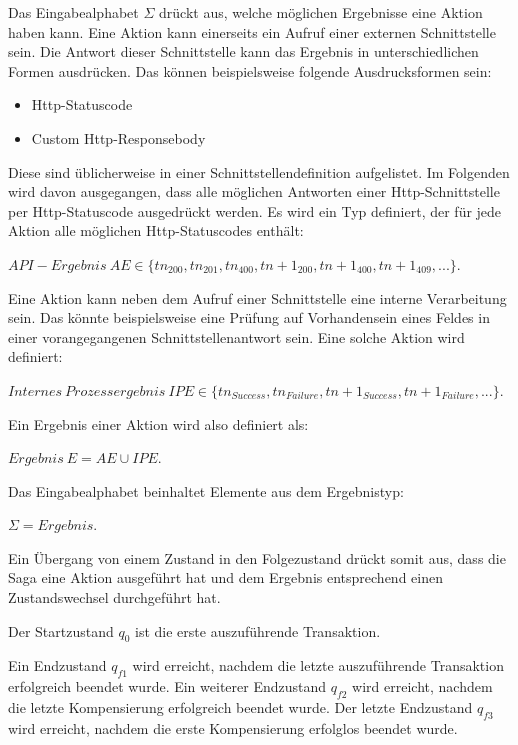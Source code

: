 Das Eingabealphabet $\Sigma$ drückt aus, welche möglichen Ergebnisse eine Aktion haben kann. Eine Aktion kann einerseits ein Aufruf einer externen Schnittstelle sein. Die Antwort dieser Schnittstelle kann das Ergebnis in unterschiedlichen Formen ausdrücken. Das können beispielsweise folgende Ausdrucksformen sein:
\begin{itemize}
	\item Http-Statuscode
	\item Custom Http-Responsebody
\end{itemize}
Diese sind üblicherweise in einer Schnittstellendefinition aufgelistet. Im Folgenden wird davon ausgegangen, dass alle möglichen Antworten einer Http-Schnittstelle per Http-Statuscode ausgedrückt werden. Es wird ein Typ definiert, der für jede Aktion alle möglichen Http-Statuscodes enthält: 

\begin{center}
	$API-Ergebnis\ AE \in \{tn_{200}, tn_{201}, tn_{400}, tn+1_{200}, tn+1_{400}, tn+1_{409}, ...\}$. 
\end{center}

Eine Aktion kann neben dem Aufruf einer Schnittstelle eine interne Verarbeitung sein. Das könnte beispielsweise eine Prüfung auf Vorhandensein eines Feldes in einer vorangegangenen Schnittstellenantwort sein. Eine solche Aktion wird definiert:

\begin{center}
	$Internes\ Prozessergebnis\ IPE \in \{tn_{Success}, tn_{Failure}, tn+1_{Success}, tn+1_{Failure}, ...\}$.
\end{center}

Ein Ergebnis einer Aktion wird also definiert als:

\begin{center}
	$Ergebnis\ E = AE \cup IPE$.
\end{center}

Das Eingabealphabet beinhaltet Elemente aus dem Ergebnistyp: 

\begin{center}
	$\Sigma = Ergebnis$.
\end{center}

Ein Übergang von einem Zustand in den Folgezustand drückt somit aus, dass die Saga eine Aktion ausgeführt hat und dem Ergebnis entsprechend einen Zustandswechsel durchgeführt hat. 

Der Startzustand $q_0$ ist die erste auszuführende Transaktion. 

Ein Endzustand $q_{f1}$ wird erreicht, nachdem die letzte auszuführende Transaktion erfolgreich beendet wurde. Ein weiterer Endzustand $q_{f2}$ wird erreicht, nachdem die letzte Kompensierung erfolgreich beendet wurde. Der letzte Endzustand $q_{f3}$ wird erreicht, nachdem die erste Kompensierung erfolglos beendet wurde.

